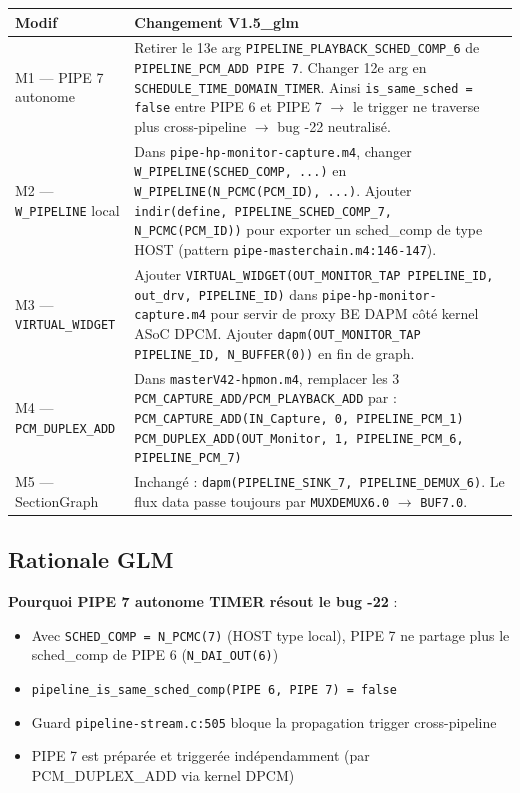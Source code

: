 \documentclass[11pt,a4paper]{article}
\begin{document}
\begin{center}
\begin{tabularx}{\textwidth}{lX}
\toprule
\textbf{Modif} & \textbf{Changement V1.5\_glm} \\
\midrule
M1 — PIPE 7 autonome & Retirer le 13e arg \texttt{PIPELINE\_PLAYBACK\_SCHED\_COMP\_6} de \texttt{PIPELINE\_PCM\_ADD PIPE 7}. Changer 12e arg en \texttt{SCHEDULE\_TIME\_DOMAIN\_TIMER}. Ainsi \texttt{is\_same\_sched = false} entre PIPE 6 et PIPE 7 $\to$ le trigger ne traverse plus cross-pipeline $\to$ bug -22 neutralisé. \\
M2 — \texttt{W\_PIPELINE} local & Dans \texttt{pipe-hp-monitor-capture.m4}, changer \texttt{W\_PIPELINE(SCHED\_COMP, ...)} en \texttt{W\_PIPELINE(N\_PCMC(PCM\_ID), ...)}. Ajouter \texttt{indir(define, PIPELINE\_SCHED\_COMP\_7, N\_PCMC(PCM\_ID))} pour exporter un sched\_comp de type HOST (pattern \texttt{pipe-masterchain.m4:146-147}). \\
M3 — \texttt{VIRTUAL\_WIDGET} & Ajouter \texttt{VIRTUAL\_WIDGET(OUT\_MONITOR\_TAP PIPELINE\_ID, out\_drv, PIPELINE\_ID)} dans \texttt{pipe-hp-monitor-capture.m4} pour servir de proxy BE DAPM côté kernel ASoC DPCM. Ajouter \texttt{dapm(OUT\_MONITOR\_TAP PIPELINE\_ID, N\_BUFFER(0))} en fin de graph. \\
M4 — \texttt{PCM\_DUPLEX\_ADD} & Dans \texttt{masterV42-hpmon.m4}, remplacer les 3 \texttt{PCM\_CAPTURE\_ADD/PCM\_PLAYBACK\_ADD} par : \newline \texttt{PCM\_CAPTURE\_ADD(IN\_Capture, 0, PIPELINE\_PCM\_1)} \newline \texttt{PCM\_DUPLEX\_ADD(OUT\_Monitor, 1, PIPELINE\_PCM\_6, PIPELINE\_PCM\_7)} \\
M5 — SectionGraph & Inchangé : \texttt{dapm(PIPELINE\_SINK\_7, PIPELINE\_DEMUX\_6)}. Le flux data passe toujours par \texttt{MUXDEMUX6.0} $\to$ \texttt{BUF7.0}. \\
\bottomrule
\end{tabularx}
\end{center}

\subsection{Rationale GLM}

\textbf{Pourquoi PIPE 7 autonome TIMER résout le bug -22} :
\begin{itemize}[leftmargin=*, itemsep=1pt]
  \item Avec \texttt{SCHED\_COMP = N\_PCMC(7)} (HOST type local), PIPE 7 ne partage plus le sched\_comp de PIPE 6 (\texttt{N\_DAI\_OUT(6)})
  \item \texttt{pipeline\_is\_same\_sched\_comp(PIPE 6, PIPE 7) = false}
  \item Guard \texttt{pipeline-stream.c:505} bloque la propagation trigger cross-pipeline
  \item PIPE 7 est préparée et triggerée indépendamment (par PCM\_DUPLEX\_ADD via kernel DPCM)
\end{itemize}
\end{document}
